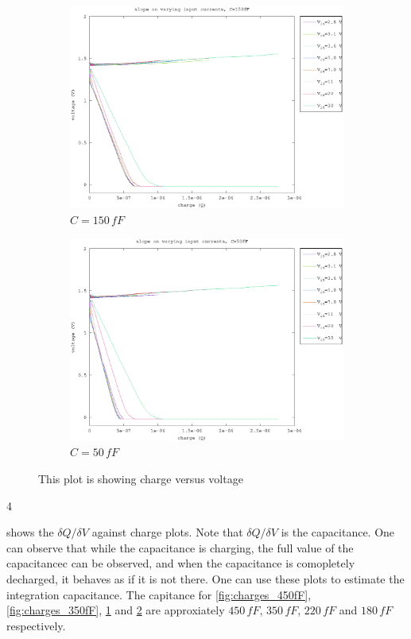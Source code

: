 \documentclass{article}
\begin{document}
\begin{figure}[h]
\begin{subfigure}[b]{0.475\textwidth}
	    \centering 
	    \includegraphics[width=\textwidth]{fig/charge_150fF.eps}
	    \caption[]%
	    {$C=150\,fF$}    
	    \label{fig:charges_150fF}
	\end{subfigure}
	\quad
	\begin{subfigure}[b]{0.475\textwidth}   
	    \centering 
	    \includegraphics[width=\textwidth]{fig/charge_50fF.eps}
	    \caption[]%
	    {$C=50\,fF$}    
	    \label{fig:charges_50fF}
	\end{subfigure}
	\caption{This plot is showing charge versus voltage}
	\label{fig:charges}
\end{figure}4

 shows the $\delta Q/\delta V$ against charge plots. Note that $\delta Q/\delta V$ is the capacitance. One can observe that while the capacitance is charging, the full value of the capacitancec can be observed, and when the capacitance is comopletely decharged, it behaves as if it is not there. One can use these plots to estimate the integration capacitance. The capitance for \cref{fig:charges_450fF}, \ref{fig:charges_350fF}, \ref{fig:charges_150fF} and \ref{fig:charges_50fF} are approxiately $450\,fF$, $350\,fF$, $220\,fF$ and $180\,fF$ respectively.
\end{document}
